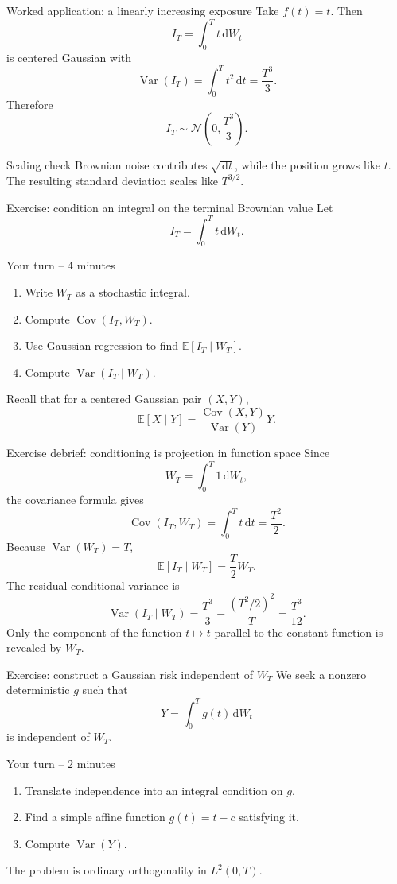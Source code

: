 \documentclass[handout,10pt,aspectratio=169]{beamer}
\newcommand{\E}{\mathbb E}
\newcommand{\dd}{\,\mathrm d}
\DeclareMathOperator{\Var}{Var}
\DeclareMathOperator{\Cov}{Cov}
\begin{document}
\begin{frame}{Worked application: a linearly increasing exposure}
Take \(f(t)=t\). Then
\[
I_T=\int_0^T t\dd W_t
\]
is centered Gaussian with
\[
\Var(I_T)=\int_0^T t^2\dd t=\frac{T^3}{3}.
\]
Therefore
\[
\boxed{I_T\sim\mathcal N\!\left(0,\frac{T^3}{3}\right).}
\]
\begin{block}{Scaling check}
Brownian noise contributes \(\sqrt{\dd t}\), while the position grows like \(t\). The resulting standard deviation scales like \(T^{3/2}\).
\end{block}
\end{frame}

\begin{frame}{Exercise: condition an integral on the terminal Brownian value}
Let
\[
I_T=\int_0^T t\dd W_t.
\]
\begin{block}{Your turn -- 4 minutes}
\begin{enumerate}\setlength{\itemsep}{0.55em}
  \item Write \(W_T\) as a stochastic integral.
  \item Compute \(\Cov(I_T,W_T)\).
  \item Use Gaussian regression to find \(\E[I_T\mid W_T]\).
  \item Compute \(\Var(I_T\mid W_T)\).
\end{enumerate}
\end{block}
Recall that for a centered Gaussian pair \((X,Y)\),
\[
\E[X\mid Y]=\frac{\Cov(X,Y)}{\Var(Y)}Y.
\]
\end{frame}

\begin{frame}{Exercise debrief: conditioning is projection in function space}
Since
\[
W_T=\int_0^T1\dd W_t,
\]
the covariance formula gives
\[
\Cov(I_T,W_T)=\int_0^T t\dd t=\frac{T^2}{2}.
\]
Because \(\Var(W_T)=T\),
\[
\boxed{\E[I_T\mid W_T]=\frac{T}{2}W_T.}
\]
The residual conditional variance is
\[
\Var(I_T\mid W_T)
=\frac{T^3}{3}-\frac{(T^2/2)^2}{T}
=\frac{T^3}{12}.
\]
Only the component of the function \(t\mapsto t\) parallel to the constant function is revealed by \(W_T\).
\end{frame}

\begin{frame}{Exercise: construct a Gaussian risk independent of \(W_T\)}
We seek a nonzero deterministic \(g\) such that
\[
Y=\int_0^T g(t)\dd W_t
\]
is independent of \(W_T\).
\begin{block}{Your turn -- 2 minutes}
\begin{enumerate}\setlength{\itemsep}{0.55em}
  \item Translate independence into an integral condition on \(g\).
  \item Find a simple affine function \(g(t)=t-c\) satisfying it.
  \item Compute \(\Var(Y)\).
\end{enumerate}
\end{block}
The problem is ordinary orthogonality in \(L^2(0,T)\).
\end{frame}
\end{document}
